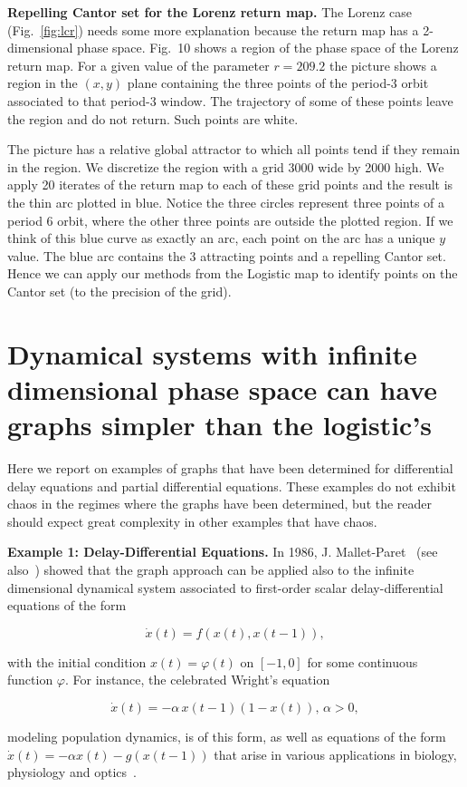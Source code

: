 \documentclass{article}
\newcommand{\allblack}{\color{black}{}}
\def\phi{\varphi}
\begin{document}
{{\bf Repelling Cantor set for the Lorenz return map.} The Lorenz case (Fig.~\ref{fig:lcr}) needs some more explanation because the return map has a 2-dimensional phase space. 
Fig.~10 shows a region of the phase space of the Lorenz return map.
For a given value of the parameter $r=209.2$ the picture shows a region in the $(x,y)$ plane containing the three points of the period-3 orbit associated to that period-3 window.
The trajectory of some of these points leave the region and do not return. Such points are white.

The picture has a relative global attractor to which all points tend if they remain in the region. 
We discretize the region with a grid 3000 wide by 2000 high. We apply 20 iterates of the return map to each of these grid points and the result is the thin arc plotted in blue. 
Notice the three circles represent three points of a period 6 orbit, where the other three points are outside the plotted region. 
If we think of this blue curve as exactly an arc, each point on the arc has a unique $y$
value. 
The blue arc contains the 3 attracting points and a repelling Cantor set. 
Hence we can apply our methods from the Logistic map to identify points on the Cantor set (to the precision of the grid).

}
\section{Dynamical systems with infinite dimensional phase space can have graphs simpler than the logistic's}\label{ddes-pdes}
\label{sec:inf}

Here we report on examples of graphs that have been determined for differential delay equations and partial differential equations. These examples do not exhibit chaos in the regimes where the graphs have been determined, but the reader should expect great complexity in other examples that have chaos.

\allblack
{\bf Example 1: Delay-Differential Equations.} In 1986, J. Mallet-Paret~\cite{MP88} (see also~\cite{KY75,KY77,McM96,HMW06,HL13}) showed that the graph approach can be applied also to the infinite dimensional dynamical system associated to first-order scalar delay-differential equations of the form
%
\begin{linenomath}
\begin{equation}
 \dot x(t) = f(x(t),x(t-1)),
 \label{eq:dd}
\end{equation}
\end{linenomath}
%
with the initial condition $x(t)=\phi(t)$ on $[-1,0]$ for some continuous function $\phi$.
For instance, the celebrated Wright's equation 
\begin{linenomath}
\begin{equation*}
\dot x(t)=-\alpha\,x(t-1)(1-x(t)),\,\alpha>0,
\end{equation*}
\end{linenomath}
modeling population dynamics, is of this form, as well as equations of the form $\dot x(t)=-\alpha x(t)-g(x(t-1))$ that arise in various applications in biology, physiology and optics~\cite{MP88}. 
\end{document}
